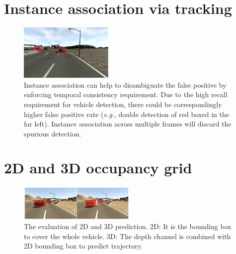 \documentclass[10pt,twocolumn,letterpaper]{article}
\begin{document}
\begin{appendices}
\section{Instance association via tracking}
\begin{figure}[h]
        \centering
        \includegraphics[width=0.4\textwidth]{figures/double_detection.png}
        \caption{
        \small{Instance association can help to disambiguate the false positive by enforcing temporal consistency requirement. Due to the high recall requirement for vehicle detection, there could be correspondingly higher false positive rate (\emph{e.g.}, double detection of red boxed in the far left). Instance association across multiple frames will discard the spurious detection.}
        }
        \label{fig:Instance_association}
\end{figure}

\section{2D and 3D occupancy grid}
\begin{figure}[h]
        \centering
        \includegraphics[width=0.5\textwidth]{figures/evaluation.pdf}
        \caption{
        \small{The evaluation of 2D and 3D prediction. 2D: It is the bounding box to cover the whole vehicle. 3D: The depth channel is combined with 2D bounding box to predict trajectory.}
        }
        \label{fig:evaluation}
\end{figure}

\end{appendices}
\end{document}

